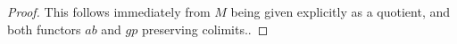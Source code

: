 \documentclass{amsbook} %
\newenvironment{eq*}{\begin{equation*}}{\end{equation*}}
\numberwithin{section}{chapter}
\begin{document}
\begin{proof}
This follows immediately from $M$ being given explicitly as a quotient, and both functors $ab$ and $gp$ preserving colimits..

%

\end{proof}
\end{document}
